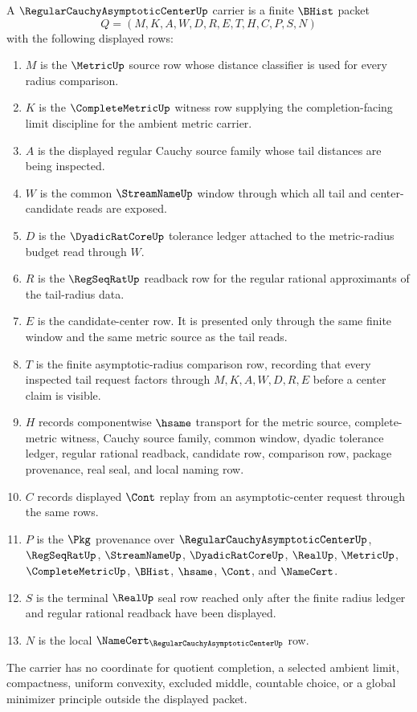 \begin{definition}
\label{def:regular-cauchy-asymptotic-center-carrier}
A $\RegularCauchyAsymptoticCenterUp$ carrier is a finite $\BHist$ packet
$$
Q=(M,K,A,W,D,R,E,T,H,C,P,S,N)
$$
with the following displayed rows:
\begin{enumerate}
\item $M$ is the $\MetricUp$ source row whose distance classifier is used for every radius comparison.
\item $K$ is the $\CompleteMetricUp$ witness row supplying the completion-facing limit discipline for the ambient metric carrier.
\item $A$ is the displayed regular Cauchy source family whose tail distances are being inspected.
\item $W$ is the common $\StreamNameUp$ window through which all tail and center-candidate reads are exposed.
\item $D$ is the $\DyadicRatCoreUp$ tolerance ledger attached to the metric-radius budget read through $W$.
\item $R$ is the $\RegSeqRatUp$ readback row for the regular rational approximants of the tail-radius data.
\item $E$ is the candidate-center row. It is presented only through the same finite window and the same metric source as the tail reads.
\item $T$ is the finite asymptotic-radius comparison row, recording that every inspected tail request factors through $M,K,A,W,D,R,E$ before a center claim is visible.
\item $H$ records componentwise $\hsame$ transport for the metric source, complete-metric witness, Cauchy source family, common window, dyadic tolerance ledger, regular rational readback, candidate row, comparison row, package provenance, real seal, and local naming row.
\item $C$ records displayed $\Cont$ replay from an asymptotic-center request through the same rows.
\item $P$ is the $\Pkg$ provenance over $\RegularCauchyAsymptoticCenterUp$, $\RegSeqRatUp$, $\StreamNameUp$, $\DyadicRatCoreUp$, $\RealUp$, $\MetricUp$, $\CompleteMetricUp$, $\BHist$, $\hsame$, $\Cont$, and $\NameCert$.
\item $S$ is the terminal $\RealUp$ seal row reached only after the finite radius ledger and regular rational readback have been displayed.
\item $N$ is the local $\NameCert_{\RegularCauchyAsymptoticCenterUp}$ row.
\end{enumerate}
The carrier has no coordinate for quotient completion, a selected ambient limit, compactness, uniform convexity, excluded middle, countable choice, or a global minimizer principle outside the displayed packet.
\end{definition}

